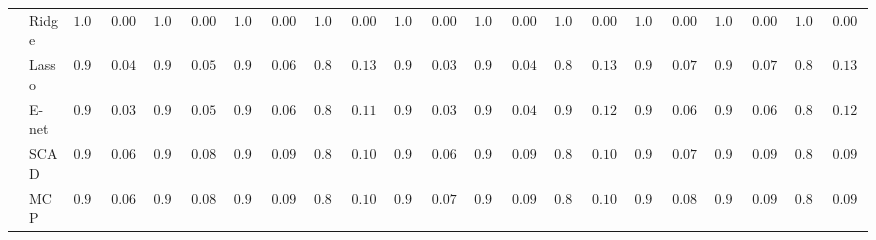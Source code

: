 \begin{tabular}{ll|ll|llllll|llllll|llllll}
 & Ridge  & $1.000$ & $0.0000$ & $1.000$ & $0.0000$ & $1.000$ & $0.0000$ & $1.000$ & $0.0000$ & $1.000$ & $0.0000$ & $1.000$ & $0.0000$ & $1.000$ & $0.0000$ & $1.000$ & $0.0000$ & $1.000$ & $0.0000$ & $1.000$ & $0.0000$ \\
 & Lasso  & $0.990$ & $0.0438$ & $0.984$ & $0.0545$ & $0.972$ & $0.0697$ & $0.878$ & $0.1360$ & $0.992$ & $0.0394$ & $0.988$ & $0.0477$ & $0.890$ & $0.1314$ & $0.968$ & $0.0737$ & $0.962$ & $0.0789$ & $0.856$ & $0.1336$ \\
 & E-net  & $0.992$ & $0.0394$ & $0.986$ & $0.0513$ & $0.976$ & $0.0653$ & $0.896$ & $0.1188$ & $0.994$ & $0.0343$ & $0.990$ & $0.0438$ & $0.908$ & $0.1285$ & $0.972$ & $0.0697$ & $0.972$ & $0.0697$ & $0.870$ & $0.1283$ \\
 & SCAD  & $0.976$ & $0.0653$ & $0.960$ & $0.0804$ & $0.928$ & $0.0965$ & $0.868$ & $0.1072$ & $0.976$ & $0.0653$ & $0.940$ & $0.0921$ & $0.846$ & $0.1058$ & $0.966$ & $0.0755$ & $0.930$ & $0.0959$ & $0.862$ & $0.0972$ \\
 & MCP  & $0.972$ & $0.0697$ & $0.956$ & $0.0833$ & $0.926$ & $0.0970$ & $0.866$ & $0.1066$ & $0.968$ & $0.0737$ & $0.922$ & $0.0980$ & $0.836$ & $0.1040$ & $0.958$ & $0.0819$ & $0.918$ & $0.0989$ & $0.856$ & $0.0988$ \\
\hline 
\end{tabular}

